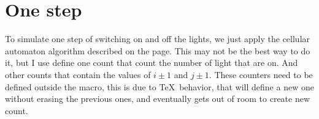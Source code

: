 \documentclass{article}
\def\size{100}
\def\setpos#1#2#3{\expandafter\xdef\csname LIGHT-#1-#2-\endcsname{#3}}
\def\getpos#1#2{\csname LIGHT-#1-#2-\endcsname}
\def\setmpos#1#2#3{\expandafter\def\csname TMP-#1-#2-\endcsname{#3}}
\def\getmpos#1#2{\csname TMP-#1-#2-\endcsname}
\def\display{%
    \begin{center}
    \nbon=0
    \begin{tikzpicture}[scale=0.1]
        \draw (0, 0) -- (\size+1, 0) -- (\size+1, \size+1) -- (0, \size+1) -- cycle;
        \foreach \i in {1,2,...,\size}{%
            \foreach \j in {1,2,...,\size}{%
                \if\getpos{\i}{\j}1
                    \global\advance\nbon by1
                    \draw[fill=magenta] (\i, \j) circle[radius=0.5cm];
                \else
                \fi
            }
        }
        \draw (\size/2, \size+1) node[anchor=south] {\the\nbon\ are On};
    \end{tikzpicture}
    \end{center}
}
\def\counton{%
    \nbon=0%
    \foreach \i in {1,2,...,\size}{%
        \foreach \j in {1,2,...,\size}{%
            \if\getpos{\i}{\j}1%
                \global\advance\nbon by1%
            \fi%
        }%
    }%
    \the\nbon
}
\def\copyback{%
    \foreach \i in {1,2,...,\size}{%
        \foreach \j in {1,2,...,\size}{%
            \global\setpos{\i}{\j}{\getmpos{\i}{\j}}
        }
    }
}
\begin{document}









\section{One step}

To simulate one step of switching on and off the lights, we just apply the cellular automaton algorithm described on the page.
This may not be the best way to do it, but I use define one count that count the number of light that are on.
And other counts that contain the values of $i\pm1$ and $j\pm1$.
These counters need to be defined outside the macro, this is due to \TeX\ behavior, that will define a new one without erasing the previous ones, and eventually gets out of room to create new count.
\end{document}
